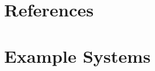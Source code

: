 \documentclass[10pt]{article}
\numberwithin{equation}{section}
\begin{document}
\clearpage
\section{References}\label{s:references}
\printbibliography[heading=none]
\clearpage\appendix
\section{Example Systems}\label{a:example-systems}
\end{document}
